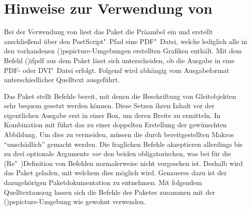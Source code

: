 \section{%
  Hinweise zur Verwendung von %
  \label{sec:tips:auto-pst-pdf}%
}

%
Bei der Verwendung von  liest das Paket  
die Präambel ein und erstellt anschließend über den PostScript"~Pfad 
 eine PDF"~Datei, welche lediglich alle in den 
vorhandenen \Environment(){pspicture}-Umgebungen erstellten 
Grafiken enthält. Mit dem Befehl \Macro(){ifpdf} aus dem Paket 
 lässt sich unterscheiden, ob die Ausgabe in eine PDF- oder 
DVI"~Datei erfolgt. Folgend wird abhängig vom Ausgabeformat unterschiedlicher 
Quelltext ausgeführt.
%
\begin{quoting}
\begin{Code}
\usepackage{iftex}
\end{Code}
\end{quoting}



Das Paket  stellt Befehle bereit, mit denen die Beschriftung 
von Gleitobjekten sehr bequem gesetzt werden können. Diese Setzen ihren Inhalt 
vor der eigentlichen Ausgabe erst in einer Box, um deren Breite zu ermitteln. 
In Kombination mit  führt das zu einer doppelten 
Erstellung der gewünschten Abbildung. Um dies zu vermeiden, müssen die durch 
 bereitgestellten Makros \enquote{unschädlich} gemacht 
werden. Die fraglichen Befehle akzeptieren allerdings bis zu drei optionale 
Argumente \emph{vor} den beiden obligatorischen, was bei  für die 
(Re"~)Definition von Befehlen normalerweise nicht vorgesehen ist. Deshalb wird 
das Paket  geladen, mit welchem dies möglich wird. Genaueres 
dazu ist der dazugehörigen Paketdokumentation zu entnehmen. Mit folgendem 
Quelltextauszug lassen sich die Befehle des Paketes  zusammen 
mit der \Environment(){pspicture}-Umgebung wie gewohnt 
verwenden.
%
\begin{quoting}
\begin{Code}
\usepackage{floatrow}
\usepackage{xparse}
\ifpdf\else
\fi
\end{Code}
\end{quoting}


